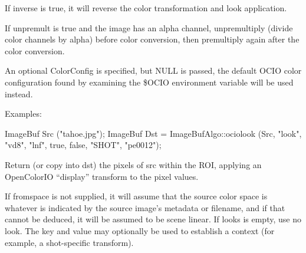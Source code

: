 If {\cf inverse} is {\cf true}, it will reverse the color transformation
and look application.

If {\cf unpremult} is {\cf true} and the image has an alpha channel,
unpremultiply (divide color channels by alpha) before color conversion, then
premultiply again after the color conversion.

An optional {\cf ColorConfig} is specified, but {\cf NULL} is passed, the
default OCIO color configuration found by examining the {\cf \$OCIO}
environment variable will be used instead.

\smallskip
\noindent Examples:
\begin{code}
    ImageBuf Src ("tahoe.jpg");
    ImageBuf Dst = ImageBufAlgo::ociolook (Src, "look", "vd8", "lnf",
                                           true, false, "SHOT", "pe0012");
\end{code}
\apiend


 
Return (or copy into {\cf dst}) the pixels of {\cf src} within the ROI,
applying an OpenColorIO ``display'' transform to the pixel values.

If {\cf fromspace} is not supplied, it will assume that the source color
space is whatever is indicated by the source image's metadata or filename,
and if that cannot be deduced, it will be assumed to be scene linear. If
{\cf looks} is empty, use no look. The {\cf key} and {\cf value} may
optionally be used to establish a context (for example, a shot-specific
transform).

